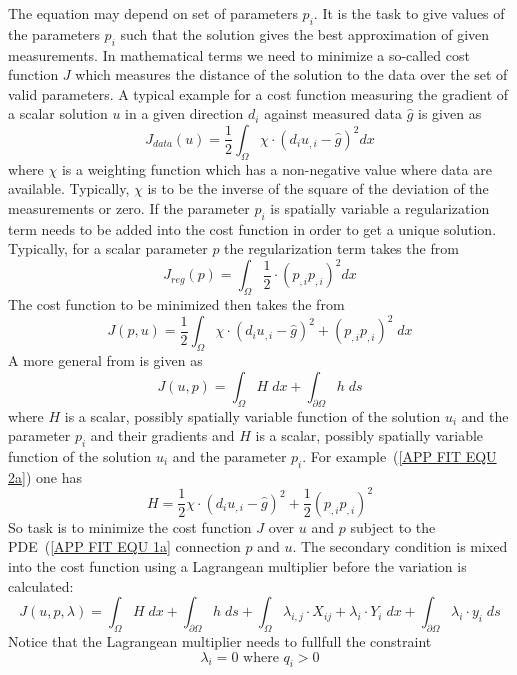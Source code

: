 The equation may depend on set of parameters $p_i$. It is the task to 
give values of the parameters $p_i$ such that the solution gives the best 
approximation of given measurements. In mathematical terms we need to minimize
a so-called cost function $J$ which measures the distance of the solution
to the data over the set of valid parameters. A typical example 
for a cost function measuring the gradient of a scalar solution $u$ 
in a given direction $d_i$ against measured data $\hat{g}$ is given as
\begin{equation}\label{APP FIT EQU 2a}
J_{data}(u) = \frac{1}{2}\int_{\Omega}  \chi \cdot ( d_i u_{,i} - \hat{g})^2 dx
\end{equation} 
where $\chi$ is a weighting function which has a non-negative value where data are available. 
Typically, $\chi$ is to be the inverse of the square of the deviation of the measurements or zero.
If the parameter $p_i$ is spatially variable a regularization term needs to be
added into the cost function in order to get a unique solution. Typically,
for a scalar parameter $p$ the regularization term takes the from
\begin{equation}\label{APP FIT EQU 3}
J_{reg}(p) =  \int_{\Omega} \frac{1}{2} \cdot (p_{,i}p_{,i})^{2} dx
\end{equation} 
The cost function to be minimized then takes the from
\begin{equation}\label{APP FIT EQU 2a}
J(p,u) = \frac{1}{2}\int_{\Omega}  \chi \cdot ( d_i u_{,i} - \hat{g})^2
+ (p_{,i}p_{,i})^{2} \;
dx
\end{equation} 
A more general from is given as 
\begin{equation}\label{APP FIT EQU 4}
J(u,p) = \int_{\Omega} H\; dx +  \int_{\partial \Omega} h \; ds
\end{equation} 
where $H$ is a scalar, possibly spatially variable  function 
of the solution $u_i$ and the parameter $p_i$ and their gradients
and  $H$ is a scalar, possibly spatially variable  function 
of the solution $u_i$ and the parameter $p_i$. For example~(\ref{APP FIT EQU 2a})
one has
\begin{equation}\label{APP FIT EQU 2a}
H = \frac{1}{2} \chi \cdot (d_i u_{,i} - \hat{g})^2 +  \frac{1}{2} (p_{,i}p_{,i})^{2} 
\end{equation} 
So task is to minimize the cost function $J$ over $u$ and $p$  
subject to the PDE~(\ref{APP FIT EQU 1a} connection $p$ and $u$. The secondary condition
is mixed into the cost function using a Lagrangean multiplier before the variation is calculated:
\begin{equation}\label{APP FIT EQU 5}
J(u,p,\lambda) = \int_{\Omega} H \; dx + \int_{\partial \Omega} h \; ds
+ \int_{\Omega} \lambda_{i,j} \cdot X_{ij} + \lambda_{i} \cdot Y_{i} \; dx
+ \int_{\partial \Omega}  \lambda_{i} \cdot y_{i} \; ds
\end{equation}
Notice that the Lagrangean multiplier needs to fullfull the constraint
\begin{equation} \label{APP FIT EQU 1b}
\lambda_{i}=0 \mbox{ where } q_i>0
\end{equation}

